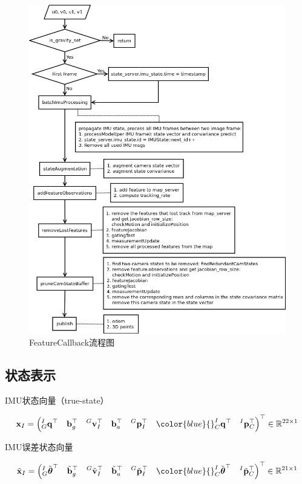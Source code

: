 \documentclass[12pt,a4paper]{article}
\begin{document}
\begin{figure}[H]
\centering
\includegraphics[scale=0.7]{images/feature_cb.png}
\caption{FeatureCallback流程图}
\end{figure}

\newpage
\subsection{状态表示}

IMU状态向量（true-state）

\begin{equation*}
\mathbf{x}_{I} = 
\left(
{}^I_G \mathbf{q}^\top \quad 
\mathbf{b}_g^\top \quad 
{}^G\mathbf{v}^\top_I \quad 
\mathbf{b}_a^\top \quad
{}^G\mathbf{p}^\top_I \quad
{\color{blue}
{}^I_C \mathbf{q}^\top \quad
{}^I\mathbf{p}^\top_C}
\right)^\top
\in \mathbb{R}^{22 \times 1}
\end{equation*}

IMU误差状态向量

\begin{equation*}
\tilde{\mathbf{x}}_{I} = 
\left(
{}^I_G \tilde{\boldsymbol{\theta}}^\top \quad 
\tilde{\mathbf{b}}_g^\top \quad 
{}^G\tilde{\mathbf{v}}^\top_I \quad 
\tilde{\mathbf{b}}_a^\top \quad
{}^G\tilde{\mathbf{p}}^\top_I \quad
{\color{blue}
{}^I_C \tilde{\boldsymbol{\theta}}^\top \quad
{}^I\tilde{\mathbf{p}}^\top_C}
\right)^\top 
\in \mathbb{R}^{21 \times 1}
\end{equation*}
\end{document}
